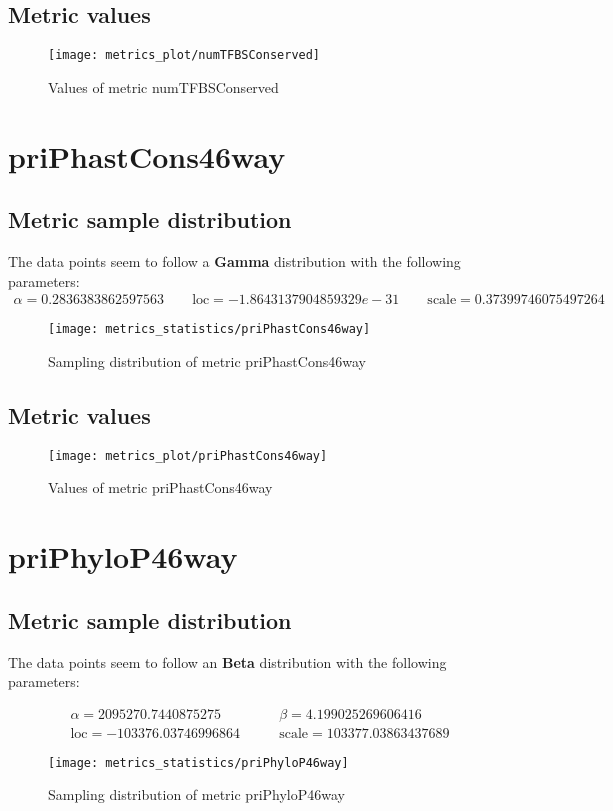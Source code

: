 \subsection{Metric values}
\begin{figure}
	\texttt{[image: metrics\_plot/numTFBSConserved]}
	\caption{Values of metric numTFBSConserved}
\end{figure}

\clearpage
\section{priPhastCons46way}
\subsection{Metric sample distribution}
The data points seem to follow a \textbf{Gamma} distribution with the following parameters:
\begin{align*}
	\alpha   = 0.2836383862597563    \qquad  \text{loc} = -1.8643137904859329e-31 \qquad \text{scale} = 0.37399746075497264
\end{align*}
\begin{figure}
	\texttt{[image: metrics\_statistics/priPhastCons46way]}
	\caption{Sampling distribution of metric priPhastCons46way}
\end{figure}
\subsection{Metric values}
\begin{figure}
	\texttt{[image: metrics\_plot/priPhastCons46way]}
	\caption{Values of metric priPhastCons46way}
\end{figure}

\clearpage
\section{priPhyloP46way}
\subsection{Metric sample distribution}
The data points seem to follow an \textbf{Beta} distribution with the following parameters:

\begin{align*}
	\alpha   = 2095270.7440875275    & \qquad  \beta = 4.199025269606416        \\
	\text{loc} = -103376.03746996864 & \qquad \text{scale} = 103377.03863437689
\end{align*}
\begin{figure}
	\texttt{[image: metrics\_statistics/priPhyloP46way]}
	\caption{Sampling distribution of metric priPhyloP46way}
\end{figure}
